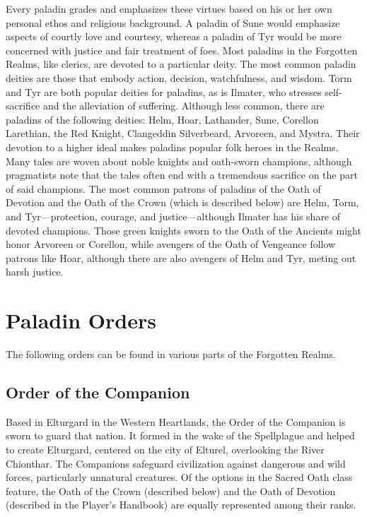 \documentclass[10pt,a4paper,twoside,twocolumn,openany,bg=print,nodeprecatedcode]{dndbook}
\begin{document}
Every paladin grades and emphasizes these virtues based on his or her own personal ethos and religious background. A paladin of Sune would emphasize aspects of courtly love and courtesy, whereas a paladin of Tyr would be more concerned with justice and fair treatment of foes.
Most paladins in the Forgotten Realms, like clerics, are devoted to a particular deity. The most common paladin deities are those that embody action, decision, watchfulness, and wisdom. Torm and Tyr are both popular deities for paladins, as is Ilmater, who stresses self-sacrifice and the alleviation of suffering. Although less common, there are paladins of the following deities: Helm, Hoar, Lathander, Sune, Corellon Larethian, the Red Knight, Clangeddin Silverbeard, Arvoreen, and Mystra.
Their devotion to a higher ideal makes paladins popular folk heroes in the Realms. Many tales are woven about noble knights and oath-sworn champions, although pragmatists note that the tales often end with a tremendous sacrifice on the part of said champions.
The most common patrons of paladins of the Oath of Devotion and the Oath of the Crown (which is described below) are Helm, Torm, and Tyr—protection, courage, and justice—although Ilmater has his share of devoted champions. Those green knights sworn to the Oath of the Ancients might honor Arvoreen or Corellon, while avengers of the Oath of Vengeance follow patrons like Hoar, although there are also avengers of Helm and Tyr, meting out harsh justice.
\section{Paladin Orders}
The following orders can be found in various parts of the Forgotten Realms.
\subsection{Order of the Companion}
Based in Elturgard in the Western Heartlands, the Order of the Companion is sworn to guard that nation. It formed in the wake of the Spellplague and helped to create Elturgard, centered on the city of Elturel, overlooking the River Chionthar. The Companions safeguard civilization against dangerous and wild forces, particularly unnatural creatures. Of the options in the Sacred Oath class feature, the Oath of the Crown (described below) and the Oath of Devotion (described in the Player's Handbook) are equally represented among their ranks.
\end{document}

